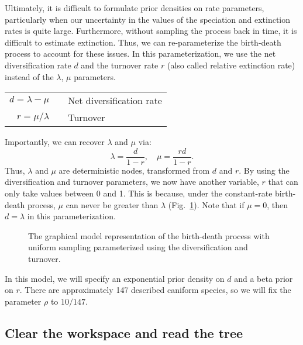 Ultimately, it is difficult to formulate prior densities on rate parameters, particularly when our uncertainty in the values of the speciation and extinction rates is quite large. 
Furthermore, without sampling the process back in time, it is difficult to estimate extinction. 
Thus, we can re-parameterize the birth-death process to account for these issues.
In this parameterization, we use the net diversification rate $d$ and the turnover rate $r$ (also called relative extinction rate) instead of the $\lambda$, $\mu$ parameters.
\begin{center}
\begin{tabular}{rcl}
$d=\lambda-\mu$ & \hspace{6mm} & Net diversification rate\\
$r=\mu / \lambda$ & & Turnover\\
\end{tabular} 
\end{center}
Importantly, we can recover $\lambda$ and $\mu$ via: 
\begin{equation}\label{lambdamufxns}
\lambda=\frac{d}{1-r}, \quad \mu=\frac{rd}{1-r}.
\end{equation}
Thus, $\lambda$ and $\mu$ are deterministic nodes, transformed from $d$ and $r$. 
By using the diversification and turnover parameters, we now have another variable, $r$ that can only take values between 0 and 1.
This is because, under the constant-rate birth-death process, $\mu$ can never be greater than $\lambda$ (Fig.~\ref{bdrGMFig2}). 
Note that if $\mu=0$, then $d = \lambda$ in this parameterization.


\begin{figure}[h!]
\centering
{}
\caption{\small The graphical model representation of the birth-death process with uniform sampling parameterized using the diversification and turnover.}
\label{bdrGMFig2}
\end{figure}

In this model, we will specify an exponential prior density on $d$ and a beta prior on $r$.
There are approximately 147 described caniform species, so we will fix the parameter $\rho$ to $10/147$.



\subsection{Clear the workspace and read the tree}

